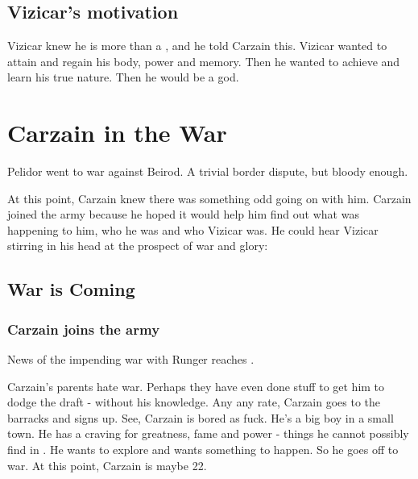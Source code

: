 \subsection{Vizicar's motivation}
Vizicar knew he is more than a \human, and he told Carzain this. 
Vizicar wanted to attain \kenosis and regain his body, power and memory. 
Then he wanted to achieve \apotheosis and learn his true nature.
Then he would be a god.












\section{Carzain in the War}
Pelidor went to war against Beirod. 
A trivial border dispute, but bloody enough. 

At this point, Carzain knew there was something odd going on with him. 
Carzain joined the army because he hoped it would help him find out what was happening to him, who he was and who Vizicar was. 
He could hear Vizicar stirring in his head at the prospect of war and glory: 

\begin{prose}
\end{prose}







\subsection{War is Coming}







\subsubsection{Carzain joins the army}
News of the impending war with Runger reaches \Redglen. 

Carzain's parents hate war. Perhaps they have even done stuff to get him to dodge the draft - without his knowledge. Any any rate, Carzain goes to the barracks and signs up. See, Carzain is bored as fuck. He's a big boy in a small town. He has a craving for greatness, fame and power - things he cannot possibly find in \Redglen. He wants to explore and wants something to happen. So he goes off to war. At this point, Carzain is maybe 22. 

